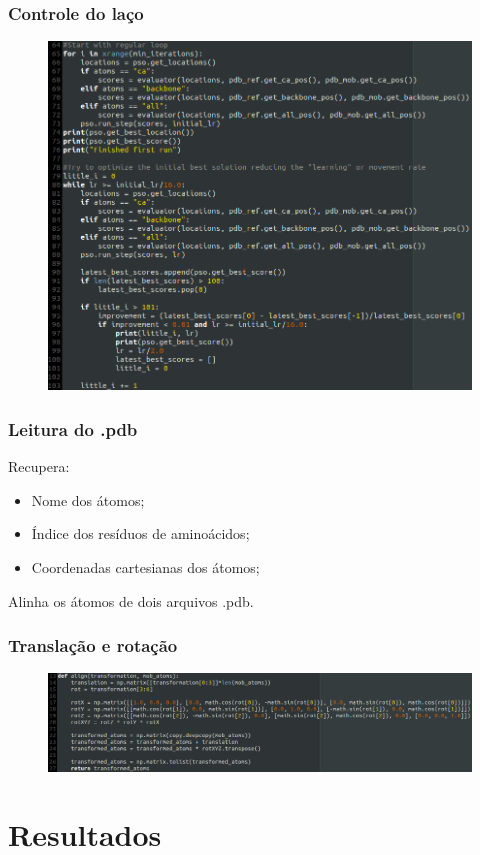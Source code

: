\documentclass{beamer}
\begin{document}
\begin{frame}
\frametitle{Controle do laço}
\begin{figure}
\includegraphics[width=0.8\linewidth]{pyloop.png}
\end{figure}
\end{frame}

\begin{frame}
\frametitle{Leitura do .pdb}
Recupera:
\begin{itemize}
\item Nome dos átomos;
\item Índice dos resíduos de aminoácidos;
\item Coordenadas cartesianas dos átomos;
\end{itemize}
Alinha os átomos de dois arquivos .pdb.
\end{frame}

\begin{frame}
\frametitle{Translação e rotação}
\begin{figure}
\includegraphics[width=1.0\linewidth]{pyrot.png}
\end{figure}
\end{frame}

\section{Resultados}
\end{document}
